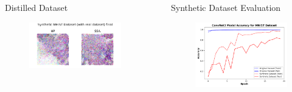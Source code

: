 \documentclass[final]{beamer}
\newlength{\sepwidth}
\newlength{\colwidth}
\newcommand{\separatorcolumn}{\begin{column}{\sepwidth}\end{column}}
\begin{document}
\begin{columns}
\begin{column}{\colwidth}
\begin{block}{Distilled Dataset}
\begin{figure}[H]
\begin{minipage}{0.43\textwidth}
					\label{fig:mhist-before}
				\end{minipage}
				\hfill
				\begin{minipage}{0.43\textwidth}
					\centering
					\includegraphics[width=\textwidth]{../report/figures/mhist_real_syn.png}
					\label{fig:mhist-after}
				\end{minipage}
				\label{fig:mhist-comparison}
			\end{figure}
			
		\end{block}
	\end{column}
	\separatorcolumn
	\begin{column}{\colwidth}
		\begin{block}{Synthetic Dataset Evaluation}
			
			\begin{figure}[ht]
				\centering
				\begin{minipage}{0.48\textwidth}
					\centering
					\includegraphics[width=\textwidth]{../report/figures/mnist_syn_acc.png}


\end{minipage}
\end{figure}
\end{block}
\end{column}
\end{columns}
\end{document}
